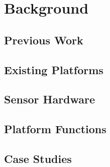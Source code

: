 \chapter{Background}
  \section{Previous Work}
  \section{Existing Platforms}
  \section{Sensor Hardware}
  \section{Platform Functions}
  \section{Case Studies}